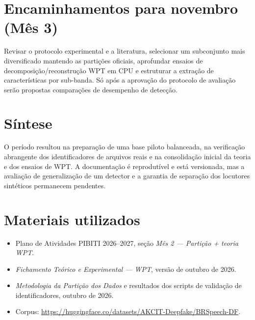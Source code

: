 \documentclass[11pt,a4paper]{article}
\begin{document}
\section{Encaminhamentos para novembro (Mês 3)}
Revisar o protocolo experimental e a literatura, selecionar um subconjunto mais diversificado mantendo as partições oficiais, aprofundar ensaios de decomposição/reconstrução WPT em CPU e estruturar a extração de características por sub-banda. Só após a aprovação do protocolo de avaliação serão propostas comparações de desempenho de detecção.
\section{Síntese}
O período resultou na preparação de uma base piloto balanceada, na verificação abrangente dos identificadores de arquivos reais e na consolidação inicial da teoria e dos ensaios de WPT. A documentação é reprodutível e está versionada, mas a avaliação de generalização de um detector e a garantia de separação dos locutores sintéticos permanecem pendentes.
\section*{Materiais utilizados}
\begin{itemize}
\item Plano de Atividades PIBITI 2026--2027, seção \emph{Mês 2 --- Partição + teoria WPT}.
\item \emph{Fichamento Teórico e Experimental --- WPT}, versão de outubro de 2026.
\item \emph{Metodologia da Partição dos Dados} e resultados dos scripts de validação de identificadores, outubro de 2026.
\item Corpus: \url{https://huggingface.co/datasets/AKCIT-Deepfake/BRSpeech-DF}.
\end{itemize}
\end{document}
